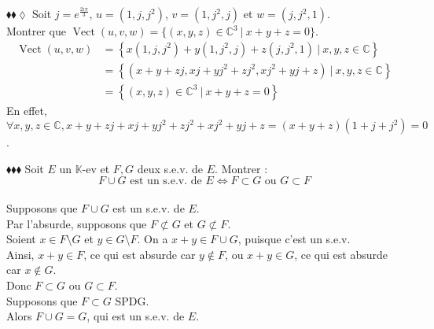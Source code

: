 \documentclass[11pt]{article}
\newcommand*{\C}{\mathbb{C}}
\newcommand*{\K}{\mathbb{K}}
\DeclareMathOperator*{\vect}{Vect}
\begin{document}
\begin{exercise}{$\blacklozenge\blacklozenge\lozenge$}{}
    Soit $j = e^{\frac{2i\pi}{3}}$, $u=(1,j,j^2)$, $v=(1,j^2,j)$ et $w=(j,j^2,1)$.\\
    Montrer que $\vect(u,v,w)=\{(x,y,z) \in \C^3 ~ | ~ x + y + z = 0\}$.
    \tcblower
    \begin{align*}
        \vect(u,v,w) &= \left\{x(1,j,j^2) + y(1,j^2,j) + z(j,j^2,1) ~ | ~ x,y,z \in \C\right\}\\
        &= \left\{(x + y + zj, xj + yj^2 + zj^2, xj^2 + yj + z) ~ | ~ x,y,z \in \C\right\}\\
        &= \left\{(x, y ,z) \in \C^3~ | ~ x + y + z = 0\right\}
    \end{align*}
    En effet, $\forall x, y, z \in \C, x + y + zj + xj + yj^2 + zj^2 + xj^2 + yj + z = (x + y + z)(1 + j + j^2) = 0$.
\end{exercise}

\begin{exercise}{$\blacklozenge\blacklozenge\blacklozenge$}{}
    Soit $E$ un $\K$-ev et $F,G$ deux s.e.v. de $E$. Montrer :
    \begin{equation*} F \cup G \text{ est un s.e.v. de } E \iff F \subset G \text{ ou } G \subset F\end{equation*}
    \tcblower\\[0.2cm]
    \fbox{$\Rightarrow$} Supposons que $F \cup G$ est un s.e.v. de $E$.\\
    Par l'absurde, supposons que $F \not\subset G$ et $G \not\subset F$.\\
    Soient $x \in F \setminus G$ et $y \in G \setminus F$. 
    On a $x + y \in F \cup G$, puisque c'est un s.e.v.\\
    Ainsi, $x+y\in F$, ce qui est absurde car $y \notin F$, ou $x + y \in G$, ce qui est absurde car $x \notin G$.\\
    Donc $F \subset G$ ou $G \subset F$.\\[0.3cm]
    \fbox{$\Leftarrow$} Supposons que $F \subset G$ SPDG.\\
    Alors $F \cup G = G$, qui est un s.e.v. de $E$.
\end{exercise}
\end{document}
